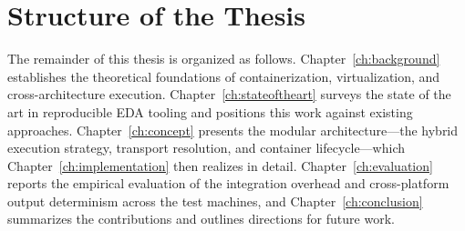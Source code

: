 \section{Structure of the Thesis}
The remainder of this thesis is organized as follows. Chapter~\ref{ch:background} establishes the theoretical foundations of containerization, virtualization, and cross-architecture execution. Chapter~\ref{ch:stateoftheart} surveys the state of the art in reproducible EDA tooling and positions this work against existing approaches. Chapter~\ref{ch:concept} presents the modular architecture---the hybrid execution strategy, transport resolution, and container lifecycle---which Chapter~\ref{ch:implementation} then realizes in detail. Chapter~\ref{ch:evaluation} reports the empirical evaluation of the integration overhead and cross-platform output determinism across the test machines, and Chapter~\ref{ch:conclusion} summarizes the contributions and outlines directions for future work.
